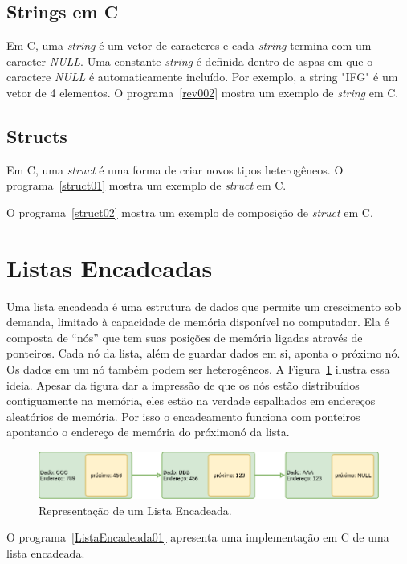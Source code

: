 \documentclass[11pt,fleqn]{book} %
\begin{document}
\subsection*{Strings em C}
Em C, uma \textit{string} é um vetor de caracteres e cada \textit{string} termina com um caracter \textit{NULL}.
Uma constante \textit{string} é definida dentro de aspas em que o caractere \textit{NULL} é automaticamente incluído.
Por exemplo, a string "IFG" é um vetor de 4 elementos.
O programa~\ref{rev002} mostra um exemplo de \textit{string} em C. 
\label{rev002}



\subsection*{Structs}
Em C, uma \textit{struct} é uma forma de criar novos tipos heterogêneos.
O programa~\ref{struct01} mostra um exemplo de \textit{struct} em C. 

\newpage
\label{struct01}

\newpage
O programa~\ref{struct02} mostra um exemplo de composição de \textit{struct} em C. 
\label{struct02}


\section{Listas Encadeadas}

Uma lista encadeada é uma estrutura de dados que permite um crescimento sob demanda, limitado à capacidade de memória disponível no computador.
Ela é composta de ``nós'' que tem suas posições de memória ligadas através de ponteiros. 
Cada nó da lista, além de guardar dados em si, aponta o próximo nó.
Os dados em um nó também podem ser heterogêneos.
A Figura~\ref{listaEncadeada} ilustra essa ideia. 
Apesar da figura dar a impressão de que os nós estão distribuídos contiguamente na memória, eles estão na verdade espalhados em endereços aleatórios de memória. 
Por isso o encadeamento funciona com ponteiros apontando o endereço de memória do próximonó da lista.
\begin{figure}
	\centering
	\includegraphics[width=.7\textwidth]{Pictures/ListaEncadeada01.png}
	\caption[Lista Encadeada]{Representação de um Lista Encadeada.}
	\label{listaEncadeada}
\end{figure}
O  programa~\ref{ListaEncadeada01} apresenta uma implementação em C de uma lista encadeada.
\newpage
\label{ListaEncadeada01}
\end{document}

